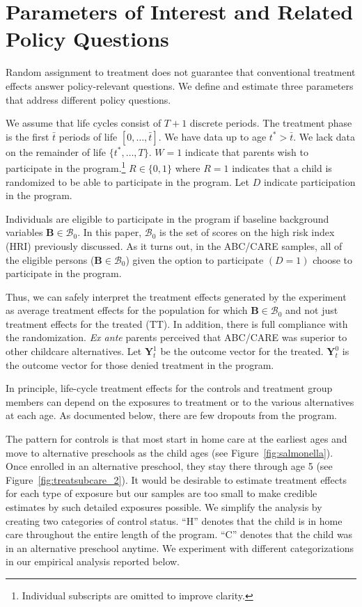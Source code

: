 \section{Parameters of Interest and Related Policy Questions} \label{section:methodsquestions}

Random assignment to treatment does not guarantee that conventional treatment effects answer policy-relevant questions. We define and estimate three parameters that address different policy questions.

We assume that life cycles consist of $T+1$ discrete periods. The treatment phase is the first $\bar{t}$ periods of life $\left[0,\dots,\bar{t}\right]$. We have data up to age $t^{*}>\bar{t}$. We lack data on the remainder of life $\{t^*,\dots,T\}$. $W=1$ indicate that parents wish to participate in the program.\footnote{Individual subscripts are omitted to improve clarity.} $R \in \{0,1\}$ where $R=1$ indicates that a child is randomized to be able to participate in the program. Let $D$ indicate participation in the program.

Individuals are eligible to participate in the program if baseline background variables $\bm{B}\in\mathcal{B}_0$. In this paper, $\mathcal{B}_0$ is the set of scores on the high risk index (HRI) previously discussed. As it turns out, in the ABC/CARE samples, all of the eligible persons ($\bm{B}\in\mathcal{B}_0$) given the option to participate $(D=1)$ choose to participate in the program.

Thus, we can safely interpret the treatment effects generated by the experiment as average treatment effects for the population for which $\bm{B}\in\mathcal{B}_0$ and not just treatment effects for the treated (TT). In addition, there is full compliance with the randomization. \emph{Ex ante} parents perceived that ABC/CARE was superior to other childcare alternatives. Let $\bm{Y}^1_t$ be the outcome vector for the treated. $\bm{Y}^0_t$ is the outcome vector for those denied treatment in the program.

In principle, life-cycle treatment effects for the controls and treatment group members can depend on the exposures to treatment or to the various alternatives at each age. As documented below, there are few dropouts from the program.

The pattern for controls is that most start in home care at the earliest ages and move to alternative preschools as the child ages (see Figure~\ref{fig:salmonella}). Once enrolled in an alternative preschool, they stay there through age 5 (see Figure~\ref{fig:treatsubcare_2}). It would be desirable to estimate treatment effects for each type of exposure but our samples are too small to make credible estimates by such detailed exposures possible. We simplify the analysis by creating two categories of control status. ``H'' denotes that the child is in home care throughout the entire length of the program. ``C'' denotes that the child was in an alternative preschool anytime. We experiment with different categorizations in our empirical analysis reported below.

